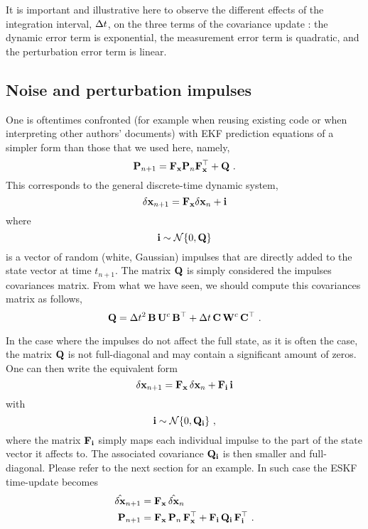 It is important and illustrative here to observe the different effects of the integration interval, $\Delta t$, on the three terms of the covariance update : the dynamic error term is exponential, the measurement error term is quadratic, and the perturbation error term is linear. 


\subsection{Noise and perturbation impulses}
\label{sec:pertImpulses}

One is oftentimes confronted (for example when reusing existing code or when interpreting other authors' documents) with EKF prediction equations of a simpler form than those that we used here, namely,
%
\begin{equation}
{\bf P}_{n+1} = {\bf F}_{\bf x}{\bf P}_n{\bf F}_{\bf x}^{\top} + {\bf Q}~.
\end{equation}
%
This corresponds to the general discrete-time dynamic system,
%
\begin{equation}
\delta{\bf x}_{n+1} = {\bf F}_{\bf x}\delta{\bf x}_n+{\bf i}
\end{equation}
%
where
%
\begin{equation}
{\bf i} \sim \mathcal{N}\{0,{\bf Q}\}
\end{equation}
%
is a vector of random (white, Gaussian) impulses that are directly added to the state vector at time $t_{n+1}$. 
The matrix ${\bf Q}$ is simply considered the impulses covariances matrix. 
From what we have seen, we should compute this covariances matrix as follows,
%
\begin{equation}
{\bf Q} = \Delta t^2\,{\bf B}\,{\bf U}^c\,{\bf B}^{\top} + \Delta t\,{\bf C}\,{\bf W}^c\,{\bf C}^{\top}~.
\end{equation}

In the case where the impulses do not affect the full state, as it is often the case, the matrix ${\bf Q}$ is not full-diagonal and may contain a significant amount of zeros. 
One can then write the equivalent form
%
\begin{equation}
\delta{\bf x}_{n+1} = {\bf F}_{\bf x}\,\delta{\bf x}_n+{\bf F}_{\bf i}\,{\bf i}
\end{equation}
%
with
%
\begin{equation}
{\bf i} \sim \mathcal{N}\{0,{\bf Q}_{\bf i}\}~,
\end{equation}
%
where the matrix ${\bf F}_{\bf i}$ simply maps each individual impulse to the part of the state vector it affects to. 
The associated covariance ${\bf Q}_{\bf i}$ is then smaller and full-diagonal. 
Please refer to the next section for an example. 
In such case the ESKF time-update becomes
%
\begin{align}
\hat{\delta{\bf x}}_{n+1} &= {\bf F}_{\bf x}\,\hat{\delta{\bf x}}_n \\
{\bf P}_{n+1} &= {\bf F}_{\bf x}\,{\bf P}_n\,{\bf F}_{\bf x}^{\top} + {\bf F}_{\bf i}\,{\bf Q}_{\bf i}\,{\bf F}_{\bf i}^{\top}~.
\end{align}
%


